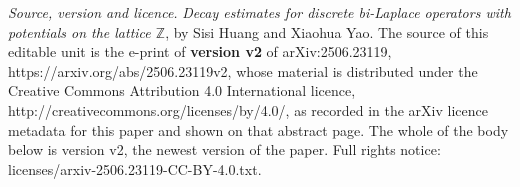 \documentclass[10pt,a4paper]{amsart}
\newcommand\Z{\mathbb{Z}}
\numberwithin{equation}{section}
\begin{document}
\maketitle
\noindent\emph{Source, version and licence.} \emph{Decay estimates for discrete bi-Laplace operators with potentials on the lattice $\Z$}, by Sisi Huang and Xiaohua Yao. The source of this editable unit is the e-print of \textbf{version v2} of arXiv:2506.23119, https://arxiv.org/abs/2506.23119v2, whose material is distributed under the Creative Commons Attribution 4.0 International licence, http://creativecommons.org/licenses/by/4.0/, as recorded in the arXiv licence metadata for this paper and shown on that abstract page. The whole of the body below is version v2, the newest version of the paper. Full rights notice: licenses/arxiv-2506.23119-CC-BY-4.0.txt.\par\smallskip
\end{document}
